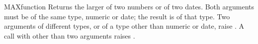 \begin{XbaseEntry}{MAX}{function}
Returns the larger of two numbers or of two dates.
\Syntax
{}
\Usage
Both arguments must be of the same type, numeric or date; the result is of that type. Two arguments of different types, or of a type other than numeric or date, raise . A call with other than two arguments raises .
\Examples
{}
\end{XbaseEntry}

